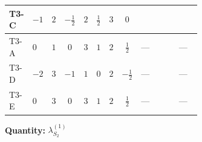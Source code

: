\documentclass[8pt]{article}
\begin{document}
\begin{landscape}
\begin{longtable}{@{}llcccccc >{\raggedright\arraybackslash}p{0.21\linewidth} >{\raggedright\arraybackslash}p{0.21\linewidth} >{\raggedright\arraybackslash}p{0.21\linewidth}@{}}
\midrule
T3-C & $-1$ & $2$ & $-\frac{1}{2}$ & $2$ & $\frac{1}{2}$ & $3$ & $0$ & \scriptsize\adjustbox{max width=\linewidth}{$\begin{gathered} +\frac{3 {g_1}^4}{4}\end{gathered}$} & \scriptsize\adjustbox{max width=\linewidth}{$\begin{gathered} +4 {\lambda_{12}^{(1)}}^2\end{gathered}$} & \scriptsize\adjustbox{max width=\linewidth}{$\begin{gathered} +\frac{{\lambda_{12}^{(A)}}^2}{4}\end{gathered}$} \\
\midrule
T3-A & $0$ & $1$ & $0$ & $3$ & $1$ & $2$ & $\frac{1}{2}$ & --- & \scriptsize\adjustbox{max width=\linewidth}{$\begin{gathered} +2 {\lambda_{12}^{(1)}}^2\end{gathered}$} & --- \\
\midrule
T3-D & $-2$ & $3$ & $-1$ & $1$ & $0$ & $2$ & $-\frac{1}{2}$ & --- & \scriptsize\adjustbox{max width=\linewidth}{$\begin{gathered} +6 {\lambda_{12}^{(1)}}^2\end{gathered}$} & --- \\
\midrule
T3-E & $0$ & $3$ & $0$ & $3$ & $1$ & $2$ & $\frac{1}{2}$ & --- & \scriptsize\adjustbox{max width=\linewidth}{$\begin{gathered} +6 {\lambda_{12}^{(1)}}^2\end{gathered}$} & --- \\
\midrule
\bottomrule
\end{longtable}
\clearpage
\noindent\textbf{Quantity: }$\lambda_{S_2}^{(1)}$\par\smallskip

\end{landscape}
\end{document}
